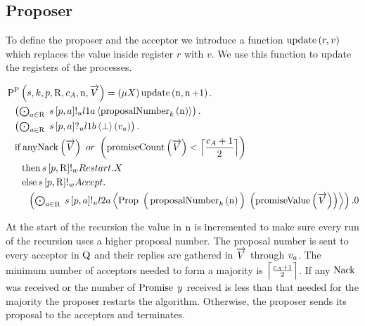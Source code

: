\subsection{Proposer}
To define the proposer and the acceptor we introduce a function $\operatorname{update} \left(r, v\right)$ which replaces the value inside register $r$ with $v$.
We use this function to update the registers of the processes.

\begin{align*}
&\Pp{
    \SessionChannel,
    \ProcessIndexK,
    \ProposerRole,
    \QRoles,
    \AcceptorCount,
    \NumberRegister,
    \VectorV
} =
\Mu{\RecursionVariable}
\update{\NumberRegister}{\NumberRegister + 1} .\\
&\Indent{1}\DotForall{
    \AcceptorRole \in \QRoles
}{
    \SendUnreliableP{\SessionChannel}{\ProposerRole}{\AcceptorRole}{\LOneA}{\proposalNumber{\NumberRegister}{\ProcessIndexK}}
} .\\
&\Indent{1}\DotForall{
    \AcceptorRole \in \QRoles
}{
    \ReceiveUnreliableP{\SessionChannel}{\ProposerRole}{\AcceptorRole}{\LOneB}{\bot}{v_{\AcceptorRole}}
} .\\
&\Indent{1}\If{
    \anyNack{\VectorV}
    \tOr
    \Paren{\promiseCount{\VectorV} < \ceil{\frac{\AcceptorCount + 1}{2}}}}\\
&\Indent{2}\Then{
    \SendWeaklyP{\SessionChannel}{\ProposerRole}{\QRoles}{\Restart}{\RecursionVariable}
}\\
&\Indent{2}\Else{
    \SendWeaklyP{\SessionChannel}{\ProposerRole}{\QRoles}{\Accept}{\\
    &\Indent{3}\DotForall{
        \AcceptorRole \in \QRoles
    }{
        \SendUnreliableP{\SessionChannel}{\ProposerRole}{\AcceptorRole}{\LTwoA}{
            \ProposalC{
                \Big ( \proposalNumber{\NumberRegister}{\ProcessIndexK} \Big )
            }{
                \Paren{\promiseValue{\VectorV}}
            }
        }
    }.\End
    }
}
\end{align*}

At the start of the recursion the value in $\operatorname{n}$ is incremented to make sure every run of the recursion uses a higher proposal number.
The proposal number is sent to every acceptor in $\operatorname{Q}$ and their replies are gathered in $\overrightarrow{V}$ through $v_{a}$.
The minimum number of acceptors needed to form a majority is $\Big\lceil \frac{c_A + 1}{2} \Big\rceil$.
If any $\operatorname{Nack}$ was received or the number of $\operatorname{Promise}\; y$ received is less than that needed for the majority the proposer restarts the algorithm.
Otherwise, the proposer sends its proposal to the acceptors and terminates.

